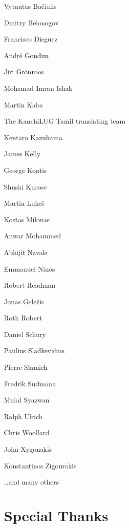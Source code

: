 \vspace{-1\baselineskip}
\begin{credits}
  \item Vytautas Bačiulis
  \item Dmitry Belonogov
  \item Francisco Dieguez
  \item André Gondim
  \item Jiri Grönroos
  \item Mohamad Imran Ishak
  \item Martin Kaba
  \item The KanchiLUG Tamil translating team
  \item Kentaro Kazuhama
  \item James Kelly
  \item George Kontis
  \item Shushi Kurose
  \item Martin Lukeš
  \item Kostas Milonas
  \item Anwar Mohammed
  \item Abhijit Navale
  \item Emmanuel Ninos
  \item Robert Readman
  \item Jonas Geležis
  \item Roth Robert
  \item Daniel Schury
  \item Paulius Sladkevičius
  \item Pierre Slamich
  \item Fredrik Sudmann
  \item Muhd Syazwan
  \item Ralph Ulrich
  \item Chris Woollard
  \item John Xygonakis
  \item Konstantinos Zigourakis
  \item \ldots and many others
\end{credits}

\section{Special Thanks}

